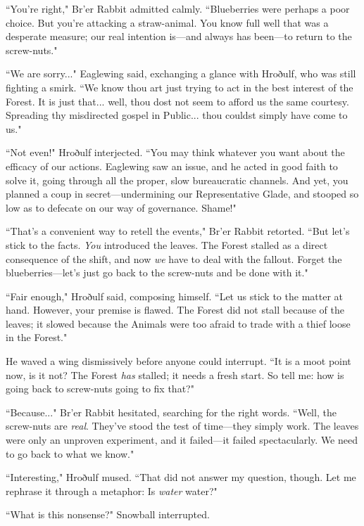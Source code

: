 ``You're right," Br'er Rabbit admitted calmly.
``Blueberries were perhaps a poor choice.
But you're attacking a straw-animal.
You know full well that was a desperate measure; our real intention is---and always has been---to return to the screw-nuts."

``We are sorry..." Eaglewing said, exchanging a glance with Hroðulf, who was still fighting a smirk.
``We know thou art just trying to act in the best interest of the Forest.
It is just that... well, thou dost not seem to afford us the same courtesy.
Spreading thy misdirected gospel in Public... thou couldst simply have come to us."

``Not even!" Hroðulf interjected.
``You may think whatever you want about the efficacy of our actions.
Eaglewing saw an issue, and he acted in good faith to solve it, going through all the proper, slow bureaucratic channels.
And yet, you planned a coup in secret---undermining our Representative Glade, and stooped so low as to defecate on our way of governance.
Shame!"

``That's a convenient way to retell the events," Br'er Rabbit retorted.
``But let's stick to the facts.
\textit{You} introduced the leaves.
The Forest stalled as a direct consequence of the shift, and now \textit{we} have to deal with the fallout.
Forget the blueberries---let's just go back to the screw-nuts and be done with it."

``Fair enough," Hroðulf said, composing himself.
``Let us stick to the matter at hand.
However, your premise is flawed.
The Forest did not stall because of the leaves; it slowed because the Animals were too afraid to trade with a thief loose in the Forest."

He waved a wing dismissively before anyone could interrupt.
``It is a moot point now, is it not?
The Forest \textit{has} stalled; it needs a fresh start.
So tell me: how is going back to screw-nuts going to fix that?"

``Because..." Br'er Rabbit hesitated, searching for the right words.
``Well, the screw-nuts are \textit{real}.
They've stood the test of time---they simply work.
The leaves were only an unproven experiment, and it failed---it failed spectacularly.
We need to go back to what we know."

``Interesting," Hroðulf mused.
``That did not answer my question, though.
Let me rephrase it through a metaphor: Is \textit{water} water?"

``What is this nonsense?" Snowball interrupted.

